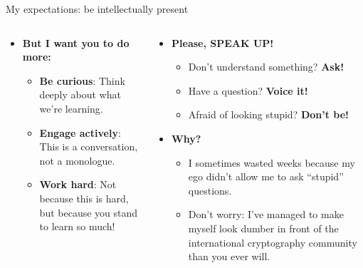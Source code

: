 \documentclass[aspectratio=169, lualatex, handout]{beamer}
\begin{document}
\begin{frame}{My expectations: be intellectually present}
	\begin{columns}[c]
		\begin{column}{0.5\textwidth}
			\begin{itemize}
				\item \textbf{But I want you to do more:}
				      \begin{itemize}[<+->]
					      \item \textbf{Be curious}: Think deeply about what we're learning.
					      \item \textbf{Engage actively}: This is a conversation, not a monologue.
					      \item \textbf{Work hard}: Not because this is hard, but because you stand to learn so much!
				      \end{itemize}
			\end{itemize}
		\end{column}
		\begin{column}{0.5\textwidth}
			\begin{itemize}
				\item \textbf{Please, SPEAK UP!}
				      \begin{itemize}[<+->]
					      \item Don't understand something? \textbf{Ask!}
					      \item Have a question? \textbf{Voice it!}
					      \item Afraid of looking stupid? \textbf{Don't be!}
				      \end{itemize}
				\item \textbf{Why?}
				      \begin{itemize}[<+->]
					      \item I sometimes wasted weeks because my ego didn't allow me to ask ``stupid'' questions.
					      \item Don't worry: I've managed to make myself look dumber in front of the international cryptography community than you ever will.
				      \end{itemize}
			\end{itemize}
		\end{column}
	\end{columns}
\end{frame}
\end{document}
